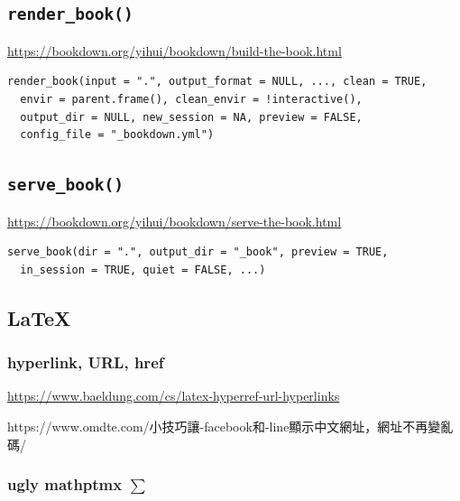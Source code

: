 \documentclass[
]{book}
\theoremstyle{definition}
\theoremstyle{definition}
\theoremstyle{definition}
\theoremstyle{definition}
\theoremstyle{remark}
\begin{document}
\hypertarget{render_book}{%
\subsection{\texorpdfstring{\texttt{render\_book()}}{render\_book()}}\label{render_book}}

\url{https://bookdown.org/yihui/bookdown/build-the-book.html}

\begin{verbatim}
render_book(input = ".", output_format = NULL, ..., clean = TRUE,
  envir = parent.frame(), clean_envir = !interactive(),
  output_dir = NULL, new_session = NA, preview = FALSE,
  config_file = "_bookdown.yml")
\end{verbatim}

\hypertarget{serve_book}{%
\subsection{\texorpdfstring{\texttt{serve\_book()}}{serve\_book()}}\label{serve_book}}

\url{https://bookdown.org/yihui/bookdown/serve-the-book.html}

\begin{verbatim}
serve_book(dir = ".", output_dir = "_book", preview = TRUE,
  in_session = TRUE, quiet = FALSE, ...)
\end{verbatim}

\hypertarget{latex-1}{%
\subsection{LaTeX}\label{latex-1}}

\hypertarget{hyperlink-url-href}{%
\subsubsection{hyperlink, URL, href}\label{hyperlink-url-href}}

\url{https://www.baeldung.com/cs/latex-hyperref-url-hyperlinks}

\begin{CJK}{UTF8}{bsmi}
https://www.omdte.com/小技巧讓-facebook和-line顯示中文網址，網址不再變亂碼/
\end{CJK}

\hypertarget{ugly-mathptmx-sum}{%
\subsubsection{\texorpdfstring{ugly mathptmx \(\sum\)}{ugly mathptmx \textbackslash sum}}\label{ugly-mathptmx-sum}}
\end{document}
